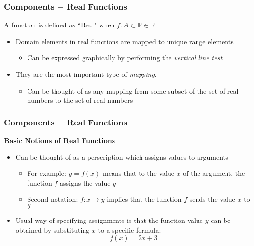 \documentclass{beamer}
\begin{document}
\begin{frame}[fragile]\frametitle{Components $-$ Real Functions}

A function is defined as ``Real" when $f: A \subset \mathbb{R} \in \mathbb{R}$
\vfill
\begin{itemize}
  \item Domain elements in real functions are mapped to unique range elements
  \begin{itemize}
    \item Can be expressed graphically by performing the \textit{vertical line test}
  \end{itemize}
  \item They are the most important type of \textit{mapping}.
  \begin{itemize}
    \item Can be thought of as any mapping from some subset of the set of real numbers to the set of real numbers
  \end{itemize}
  
\end{itemize}

\end{frame}

\begin{frame}[fragile]\frametitle{Components $-$ Real Functions}
\begin{center}\textbf{Basic Notions of Real Functions} \end{center}

\vfill
\begin{itemize}
  \item Can be thought of as a perscription which assigns values to arguments
  \begin{itemize}
    \item For example: $y = f(x)$ means that to the value $x$ of the argument, the function $f$ assigns the value $y$
    \item Second notation: $f:x \to y$ implies that the function $f$ sends the value $x$ to $y$
  \end{itemize}
  \item Usual way of specifying assignments is that the function value $y$ can be obtained by substituting $x$ to a specific formula:
  \begin{equation*}
    f(x) = 2x + 3
  \end{equation*}
  
\end{itemize}

\end{frame}
\end{document}
